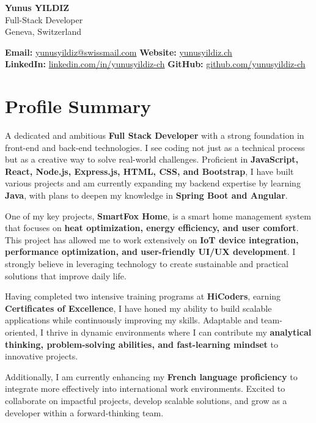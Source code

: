 \documentclass[a4paper,10pt]{article}
\begin{document}
\begin{center}
    {\LARGE \bfseries Yunus YILDIZ} \\
    {\large Full-Stack Developer} \\
    {\small Geneva, Switzerland}
\end{center}


\noindent\textbf{Email:} \href{mailto:yunusyildiz@swissmail.com}{yunusyildiz@swissmail.com} \hfill
\textbf{Website:} \href{https://yunusyildiz.ch}{yunusyildiz.ch} \\
\textbf{LinkedIn:} \href{https://www.linkedin.com/in/yunusyildiz-ch/}{linkedin.com/in/yunusyildiz-ch} \hfill
\textbf{GitHub:} \href{https://github.com/yunusyildiz-ch}{github.com/yunusyildiz-ch}

\section*{Profile Summary}
\noindent A dedicated and ambitious \textbf{Full Stack Developer} with a strong foundation in front-end and back-end technologies. I see coding not just as a technical process but as a creative way to solve real-world challenges. Proficient in \textbf{JavaScript, React, Node.js, Express.js, HTML, CSS, and Bootstrap}, I have built various projects and am currently expanding my backend expertise by learning \textbf{Java}, with plans to deepen my knowledge in \textbf{Spring Boot and Angular}.  

\noindent One of my key projects, \textbf{SmartFox Home}, is a smart home management system that focuses on \textbf{heat optimization, energy efficiency, and user comfort}. This project has allowed me to work extensively on \textbf{IoT device integration, performance optimization, and user-friendly UI/UX development}. I strongly believe in leveraging technology to create sustainable and practical solutions that improve daily life.  

\noindent Having completed two intensive training programs at \textbf{HiCoders}, earning \textbf{Certificates of Excellence}, I have honed my ability to build scalable applications while continuously improving my skills. Adaptable and team-oriented, I thrive in dynamic environments where I can contribute my \textbf{analytical thinking, problem-solving abilities, and fast-learning mindset} to innovative projects.  

\noindent Additionally, I am currently enhancing my \textbf{French language proficiency} to integrate more effectively into international work environments. Excited to collaborate on impactful projects, develop scalable solutions, and grow as a developer within a forward-thinking team.  
\end{document}
